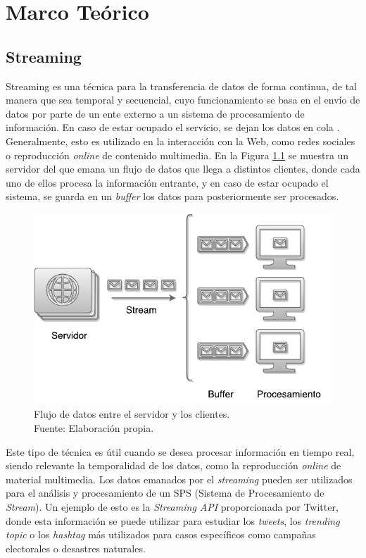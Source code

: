\chapter{Marco Te\'orico}
\label{cap:marcoTeorico}

\section{Streaming}
\label{sec:streaming}

Streaming es una t\'ecnica para la transferencia de datos de forma continua, de tal manera que sea temporal y secuencial, cuyo funcionamiento se basa en el env\'io de datos por parte de un ente externo a un sistema de procesamiento de informaci\'on. \normalsize{En caso} de estar ocupado el servicio, se dejan los datos en cola \citep{Menin2002SMH}. Generalmente, esto es utilizado en la interacci\'on con la Web, como redes sociales o reproducci\'on \textit{online} de contenido multimedia. En la Figura \ref{fig:streaming} se muestra un servidor \normalsize{del} que emana un flujo de datos que llega a distintos clientes, donde cada uno de ellos procesa la informaci\'on entrante, y en caso de estar ocupado el sistema, se guarda en un \textit{buffer} los datos para posteriormente ser procesados.

\begin{figure}[ht!]
  \centering
    \includegraphics[scale=0.7]{images/Streaming.pdf}
  \caption[Flujo de datos entre el servidor y los clientes.]{Flujo de datos entre el servidor y los clientes. \\Fuente: Elaboración propia.}
  \label{fig:streaming}
\end{figure}

Este tipo de t\'ecnica es \'util cuando se desea procesar informaci\'on en tiempo real, siendo relevante la temporalidad de los datos, como la reproducci\'on \textit{online} de material multimedia. Los datos emanados por el \textit{streaming} pueden ser utilizados para el an\'alisis y procesamiento de un SPS (Sistema de Procesamiento de \textit{Stream}). Un ejemplo de esto es la \textit{Streaming API} proporcionada por Twitter, donde esta informaci\'on se puede utilizar para estudiar los \textit{tweets}, los \textit{trending topic} o los \textit{hashtag} m\'as utilizados para casos espec\'ificos como campa\~nas electorales o desastres naturales.


